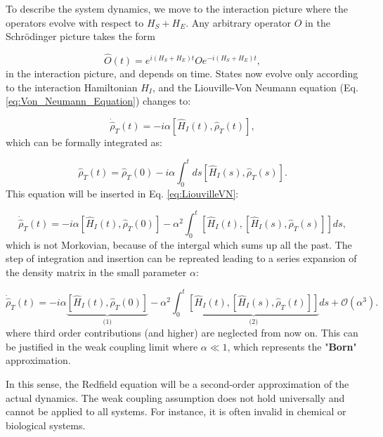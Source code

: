 To describe the system dynamics, we move to the interaction picture where the operators evolve with respect to $H_S + H_E$.
Any arbitrary operator $O$ in the Schrödinger picture takes the form

\begin{equation}
	\hat{O}(t) = e^{i(H_S+H_E)t} O e^{-i(H_S+H_E)t},
	\label{eq:Interaction_Picture_Operators}
\end{equation}
in the interaction picture, and depends on time.
States now evolve only according to the interaction Hamiltonian $H_I$, and the Liouville-Von Neumann equation (Eq. \eqref{eq:Von_Neumann_Equation}) changes to:

\begin{equation}
	\dot{\hat{\rho}}_T(t) = -i \alpha [\hat{H}_I(t), \hat{\rho}_T(t)],
	\label{eq:LiouvilleVN}
\end{equation}
which can be formally integrated as:

\begin{equation}
	\hat{\rho}_T(t) = \hat{\rho}_T(0) - i \alpha \int_0^t ds [\hat{H}_I(s), \hat{\rho}_T(s)].
	\label{eq:Formal_Integration}
\end{equation}
This equation will be inserted in Eq. \eqref{eq:LiouvilleVN}:

\begin{equation}
	\dot{\hat{\rho}}_T(t) = -i \alpha \left[ \hat{H}_I(t), \hat{\rho}_T(0) \right]
	- \alpha^2 \int_0^t \left[ \hat{H}_I(t), \left[ \hat{H}_I(s), \hat{\rho}_T(s) \right] \right] ds,
	\label{eq:Second_Order_Expansion}
\end{equation}
which is not Morkovian, because of the intergal which sums up all the past.
The step of integration and insertion can be repreated leading to a series expansion of the density matrix in the small parameter $\alpha$:

\begin{equation}
	\dot{\hat{\rho}}_T(t) = -i \alpha \underbrace{\left[ \hat{H}_I(t), \hat{\rho}_T(0) \right]}_{\text{(1)}}
	- \alpha^2 \int_0^t \underbrace{\left[ \hat{H}_I(t), \left[ \hat{H}_I(s), \hat{\rho}_T(t) \right] \right]}_{\text{(2)}} ds + \mathcal{O} (\alpha^3).
	\label{eq:Second_Order_Expansion_wo_third}
\end{equation}
where third order contributions (and higher) are neglected from now on.
This can be justified in the weak coupling limit where $ \alpha \ll 1 $, which represents the "\textbf{Born}" approximation.

In this sense, the Redfield equation will be a second-order approximation of the actual dynamics.
The weak coupling assumption does not hold universally and cannot be applied to all systems.
For instance, it is often invalid in chemical or biological systems.

